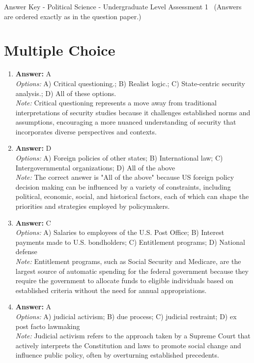 \documentclass[12pt]{article}
\begin{document}
\begin{center}
Answer Key - Political Science - Undergraduate Level Assessment 1 \
\small (Answers are ordered exactly as in the question paper.)
\end{center}

\section*{Multiple Choice}
\begin{enumerate}[label=\arabic*.]
\item \textbf{Answer:} A
\\ \textit{Options:} A) Critical questioning.; B) Realist logic.; C) State-centric security analysis.; D) All of these options.
\\ \textit{Note:} Critical questioning represents a move away from traditional interpretations of security studies because it challenges established norms and assumptions, encouraging a more nuanced understanding of security that incorporates diverse perspectives and contexts.
\item \textbf{Answer:} D
\\ \textit{Options:} A) Foreign policies of other states; B) International law; C) Intergovernmental organizations; D) All of the above
\\ \textit{Note:} The correct answer is "All of the above" because US foreign policy decision making can be influenced by a variety of constraints, including political, economic, social, and historical factors, each of which can shape the priorities and strategies employed by policymakers.
\item \textbf{Answer:} C
\\ \textit{Options:} A) Salaries to employees of the U.S. Post Office; B) Interest payments made to U.S. bondholders; C) Entitlement programs; D) National defense
\\ \textit{Note:} Entitlement programs, such as Social Security and Medicare, are the largest source of automatic spending for the federal government because they require the government to allocate funds to eligible individuals based on established criteria without the need for annual appropriations.
\item \textbf{Answer:} A
\\ \textit{Options:} A) judicial activism; B) due process; C) judicial restraint; D) ex post facto lawmaking
\\ \textit{Note:} Judicial activism refers to the approach taken by a Supreme Court that actively interprets the Constitution and laws to promote social change and influence public policy, often by overturning established precedents.

\end{enumerate}
\end{document}
